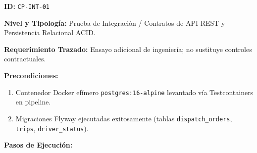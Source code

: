 \par\noindent\textbf{ID:} \texttt{C\allowbreak{}P\allowbreak{}-\allowbreak{}I\allowbreak{}N\allowbreak{}T\allowbreak{}-\allowbreak{}0\allowbreak{}1\allowbreak{}}\par
\par\noindent\textbf{Nivel y Tipología:} Prueba de Integración / Contratos de API REST y Persistencia Relacional ACID.\par
\par\noindent\textbf{Requerimiento Trazado:} Ensayo adicional de ingeniería; no sustituye controles contractuales.\par
\par\noindent\textbf{Precondiciones:} \par
\begin{enumerate}
\item Contenedor Docker efímero \texttt{p\allowbreak{}o\allowbreak{}s\allowbreak{}t\allowbreak{}g\allowbreak{}r\allowbreak{}e\allowbreak{}s\allowbreak{}:\allowbreak{}1\allowbreak{}6\allowbreak{}-\allowbreak{}a\allowbreak{}l\allowbreak{}p\allowbreak{}i\allowbreak{}n\allowbreak{}e\allowbreak{}} levantado vía Testcontainers en pipeline.
\item Migraciones Flyway ejecutadas exitosamente (tablas \texttt{d\allowbreak{}i\allowbreak{}s\allowbreak{}p\allowbreak{}a\allowbreak{}t\allowbreak{}c\allowbreak{}h\allowbreak{}\_\allowbreak{}o\allowbreak{}r\allowbreak{}d\allowbreak{}e\allowbreak{}r\allowbreak{}s\allowbreak{}}, \texttt{t\allowbreak{}r\allowbreak{}i\allowbreak{}p\allowbreak{}s\allowbreak{}}, \texttt{d\allowbreak{}r\allowbreak{}i\allowbreak{}v\allowbreak{}e\allowbreak{}r\allowbreak{}\_\allowbreak{}s\allowbreak{}t\allowbreak{}a\allowbreak{}t\allowbreak{}u\allowbreak{}s\allowbreak{}}).
\end{enumerate}
\par\noindent\textbf{Pasos de Ejecución:} \par
